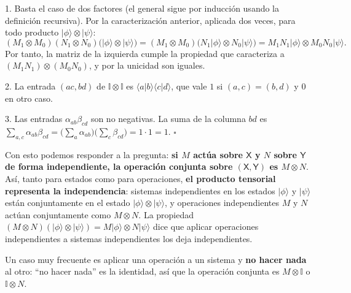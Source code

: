 \documentclass[11pt, a4paper, twoside, openright]{report}
\begin{document}
\begin{tcolorbox}[colback=gray!5!white,colframe=gray!75!black,title=\textbf{Demostración}]
1. Basta el caso de dos factores (el general sigue por inducción usando la definición recursiva). Por la caracterización anterior, aplicada dos veces, para todo producto $|\phi\rangle\otimes|\psi\rangle$:
\[ (M_1\otimes M_0)(N_1\otimes N_0)\big(|\phi\rangle\otimes|\psi\rangle\big) = (M_1\otimes M_0)\big(N_1|\phi\rangle\otimes N_0|\psi\rangle\big) = M_1N_1|\phi\rangle\otimes M_0N_0|\psi\rangle. \]
Por tanto, la matriz de la izquierda cumple la propiedad que caracteriza a $(M_1N_1)\otimes(M_0N_0)$, y por la unicidad son iguales.

2. La entrada $(ac, bd)$ de $\mathbb{I}\otimes\mathbb{I}$ es $\langle a|b\rangle\langle c|d\rangle$, que vale $1$ si $(a,c) = (b,d)$ y $0$ en otro caso.

3. Las entradas $\alpha_{ab}\beta_{cd}$ son no negativas. La suma de la columna $bd$ es $\sum_{a,c}\alpha_{ab}\beta_{cd} = \big(\sum_a\alpha_{ab}\big)\big(\sum_c\beta_{cd}\big) = 1\cdot1 = 1$. \hfill $\square$
\end{tcolorbox}

\noindent Con esto podemos responder a la pregunta: \textbf{si $M$ actúa sobre $\mathsf{X}$ y $N$ sobre $\mathsf{Y}$ de forma independiente, la operación conjunta sobre $(\mathsf{X},\mathsf{Y})$ es $M\otimes N$}. Así, tanto para estados como para operaciones, \textbf{el producto tensorial representa la independencia}: sistemas independientes en los estados $|\phi\rangle$ y $|\psi\rangle$ están conjuntamente en el estado $|\phi\rangle\otimes|\psi\rangle$, y operaciones independientes $M$ y $N$ actúan conjuntamente como $M\otimes N$. La propiedad $(M\otimes N)(|\phi\rangle\otimes|\psi\rangle) = M|\phi\rangle\otimes N|\psi\rangle$ dice que aplicar operaciones independientes a sistemas independientes los deja independientes.

\noindent Un caso muy frecuente es aplicar una operación a un sistema y \textbf{no hacer nada} al otro: ``no hacer nada'' es la identidad, así que la operación conjunta es $M\otimes\mathbb{I}$ o $\mathbb{I}\otimes N$.
\end{document}
